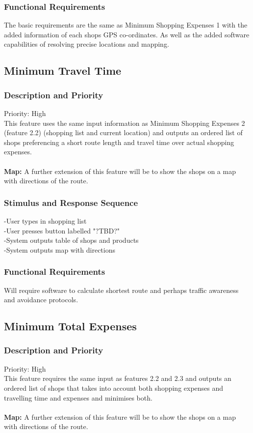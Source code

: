 \documentclass[12pt]{article}
\begin{document}
 \subsubsection{Functional Requirements}
 The basic requirements are the same as Minimum Shopping Expenses 1 with the added information of each shops GPS co-ordinates. As well as the added software capabilities of resolving precise locations and mapping.
 
 \subsection{Minimum Travel Time}
\subsubsection{Description and Priority}
 Priority: High\\
 This feature uses the same input information as Minimum Shopping Expenses 2 (feature 2.2) (shopping list and current location) and outputs an ordered list of shops preferencing a short route length and travel time over actual shopping expenses.  
\\\\
\textbf{Map:} A further extension of this feature will be to show the shops on a map with directions of the route.
 \subsubsection{Stimulus and Response Sequence}
-User types in shopping list\\
-User presses button labelled "?TBD?"\\
-System outputs table of shops and products\\
-System outputs map with directions\\ \subsubsection{Functional Requirements}
Will require software to calculate shortest route and perhaps traffic awareness and avoidance  protocols.
 
 \subsection{Minimum Total Expenses}
\subsubsection{Description and Priority}
 Priority: High\\
 This feature requires the same input as features 2.2 and 2.3 and outputs an ordered list of shops that takes into account both shopping expenses and travelling time and expenses and minimises both. 
 \\\\
\textbf{Map:} A further extension of this feature will be to show the shops on a map with directions of the route.
\end{document}
